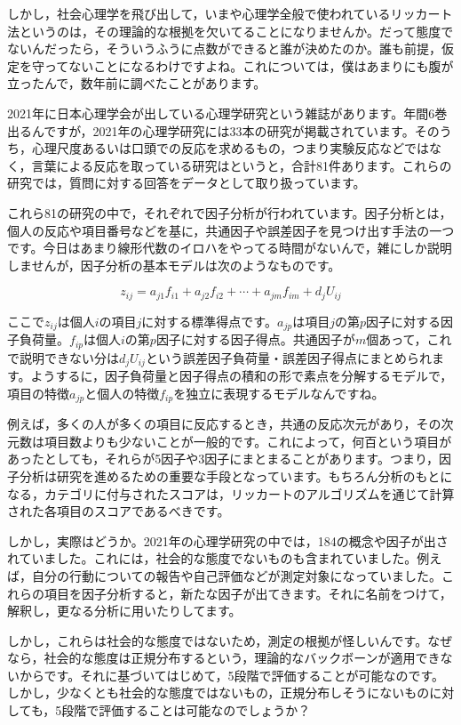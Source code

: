 \documentclass{ltjsbook}
\begin{document}
しかし，社会心理学を飛び出して，いまや心理学全般で使われているリッカート法というのは，その理論的な根拠を欠いてることになりませんか。だって態度でないんだったら，そういうふうに点数ができると誰が決めたのか。誰も前提，仮定を守ってないことになるわけですよね。これについては，僕はあまりにも腹が立ったんで，数年前に調べたことがあります。

2021年に日本心理学会が出している心理学研究という雑誌があります。年間6巻出るんですが，2021年の心理学研究には33本の研究が掲載されています。そのうち，心理尺度あるいは口頭での反応を求めるもの，つまり実験反応などではなく，言葉による反応を取っている研究はというと，合計81件あります。これらの研究では，質問に対する回答をデータとして取り扱っています。

これら81の研究の中で，それぞれで因子分析が行われています。因子分析とは，個人の反応や項目番号などを基に，共通因子や誤差因子を見つけ出す手法の一つです。今日はあまり線形代数のイロハをやってる時間がないんで，雑にしか説明しませんが，因子分析の基本モデルは次のようなものです。

\[ z_{ij} = a_{j1}f_{i1}+a_{j2}f_{i2}+\cdots+a_{jm}f_{im}+d_jU_{ij} \]

ここで$z_{ij}$は個人$i$の項目$j$に対する標準得点です。$a_{jp}$は項目$j$の第$p$因子に対する因子負荷量。$f_{ip}$は個人$i$の第$p$因子に対する因子得点。共通因子が$m$個あって，これで説明できない分は$d_jU_{ij}$という誤差因子負荷量・誤差因子得点にまとめられます。ようするに，因子負荷量と因子得点の積和の形で素点を分解するモデルで，項目の特徴$a_{jp}$と個人の特徴$f_{ip}$を独立に表現するモデルなんですね。

例えば，多くの人が多くの項目に反応するとき，共通の反応次元があり，その次元数は項目数よりも少ないことが一般的です。これによって，何百という項目があったとしても，それらが5因子や3因子にまとまることがあります。つまり，因子分析は研究を進めるための重要な手段となっています。もちろん分析のもとになる，カテゴリに付与されたスコアは，リッカートのアルゴリズムを通じて計算された各項目のスコアであるべきです。

しかし，実際はどうか。2021年の心理学研究の中では，184の概念や因子が出されていました。これには，社会的な態度でないものも含まれていました。例えば，自分の行動についての報告や自己評価などが測定対象になっていました。これらの項目を因子分析すると，新たな因子が出てきます。それに名前をつけて，解釈し，更なる分析に用いたりしてます。

しかし，これらは社会的な態度ではないため，測定の根拠が怪しいんです。なぜなら，社会的な態度は正規分布するという，理論的なバックボーンが適用できないからです。それに基づいてはじめて，5段階で評価することが可能なのです。しかし，少なくとも社会的な態度ではないもの，正規分布しそうにないものに対しても，5段階で評価することは可能なのでしょうか？
\end{document}
